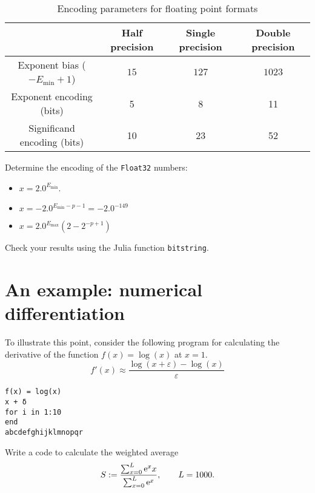 \begin{table}[hb]
    \centering
    \begin{tabular}{|c|c|c|c|}
        \hline
        & Half precision & Single precision & Double precision
        \\ \hline
        Exponent bias ($-E_{\min} + 1$) & $15$ & $127$ & $1023$
        \\ \hline
        Exponent encoding (bits) & 5 & 8 & 11
        \\ \hline
        Significand encoding (bits) & 10 & 23 & 52
        \\ \hline
    \end{tabular}
    \caption{Encoding parameters for floating point formats}%
    \label{table:floating_point_formats_encoding}
\end{table}

\begin{exercise}
    Determine the encoding of the \texttt{Float32} numbers:
    \begin{itemize}
        \item $x = 2.0^{E_{\min}}$.
        \item $x = - 2.0^{E_{\min} - p - 1} = - 2.0^{-149}$
        \item $x = 2.0^{E_{\max}} (2-2^{-p+1})$
    \end{itemize}
    Check your results using the Julia function \texttt{bitstring}.
\end{exercise}

\section{An example: numerical differentiation}%
To illustrate this point,
consider the following program for calculating the derivative of the function $f(x) = \log(x)$ at $x = 1$.
\[
    f'(x) \approx \frac{\log(x + \varepsilon) - \log(x)}{\varepsilon}
\]
\begin{verbatim}
f(x) = log(x)
x + δ
for i in 1:10
end
abcdefghijklmnopqr
\end{verbatim}

\begin{exercise}
    Write a code to calculate the weighted average
    \[
        S := \frac
        {\sum_{x=0}^{L} \mathrm e^x x}
        {\sum_{x=0}^{L} \mathrm e^x},
        \qquad L = 1000.
    \]
\end{exercise}




